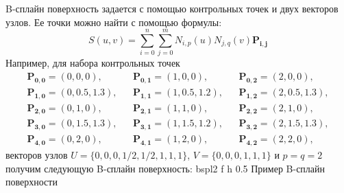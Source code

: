 \documentclass{bmstu}
\begin{document}
B-сплайн поверхность задается с помощью контрольных точек и двух векторов узлов. Ее точки можно найти с помощью формулы:
\begin{equation}
    S(u, v) = \sum\limits_{i=0}^n\sum\limits_{j=0}^m N_{i,p}(u)N_{j,q}(v)\mathbf{P_{i,j}}
\end{equation}
Например, для набора контрольных точек
\begin{equation*}
    \begin{matrix}

        \mathbf{P_{0,0}}=(0,0,0),     &  & \mathbf{P_{0,1}}=(1,0,0),       &  & \mathbf{P_{0,2}}=(2,0,0),     \\
        \mathbf{P_{1,0}}=(0,0.5,1.3), &  & \mathbf{P_{1,1}}=(1,0.5,1.2)  , &  & \mathbf{P_{1,2}}=(2,0.5,1.3), \\
        \mathbf{P_{2,0}}=(0,1,0)    , &  & \mathbf{P_{2,1}}=(1,1,0)      , &  & \mathbf{P_{2,2}}=(2,1,0)    , \\
        \mathbf{P_{3,0}}=(0,1.5,1.3), &  & \mathbf{P_{3,1}}=(1,1.5,1.2)  , &  & \mathbf{P_{3,2}}=(2,1.5,1.3), \\
        \mathbf{P_{4,0}}=(0,2,0)    , &  & \mathbf{P_{4,1}}=(1,2,0)      , &  & \mathbf{P_{4,2}}=(2,2,0)    ,
    \end{matrix}
\end{equation*}
векторов узлов $U = \{0,0,0,1/2,1/2,1,1,1\}$, $V = \{0,0,0,1,1,1\}$ и $p=q=2$ получим следующую B-сплайн поверхность:
{bspl2} %
{f} %
{h} %
{0.5\textwidth} %
{Пример B-сплайн поверхности} %
\end{document}
